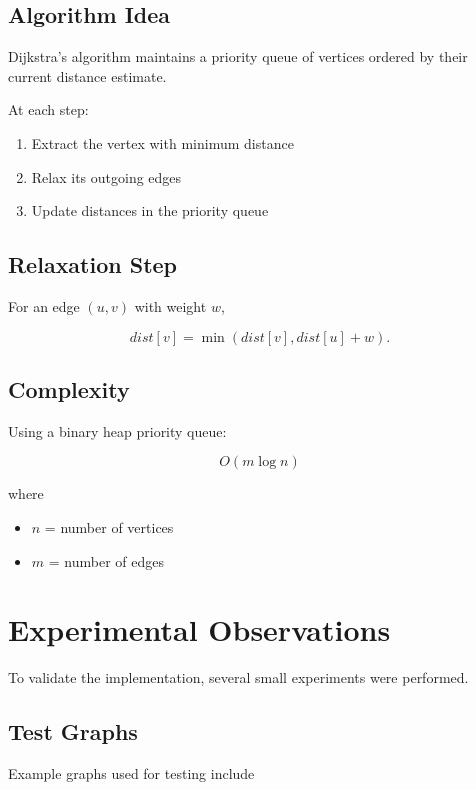 \documentclass[11pt]{article}
\begin{document}
\subsection{Algorithm Idea}

Dijkstra's algorithm maintains a priority queue of vertices ordered by their
current distance estimate.

At each step:

\begin{enumerate}
\item Extract the vertex with minimum distance
\item Relax its outgoing edges
\item Update distances in the priority queue
\end{enumerate}

\subsection{Relaxation Step}

For an edge $(u,v)$ with weight $w$,

\[
dist[v] = \min(dist[v], dist[u] + w).
\]

\subsection{Complexity}

Using a binary heap priority queue:

\[
O(m \log n)
\]

where

\begin{itemize}
\item $n$ = number of vertices
\item $m$ = number of edges
\end{itemize}

\section{Experimental Observations}

To validate the implementation, several small experiments were performed.

\subsection{Test Graphs}

Example graphs used for testing include
\end{document}
